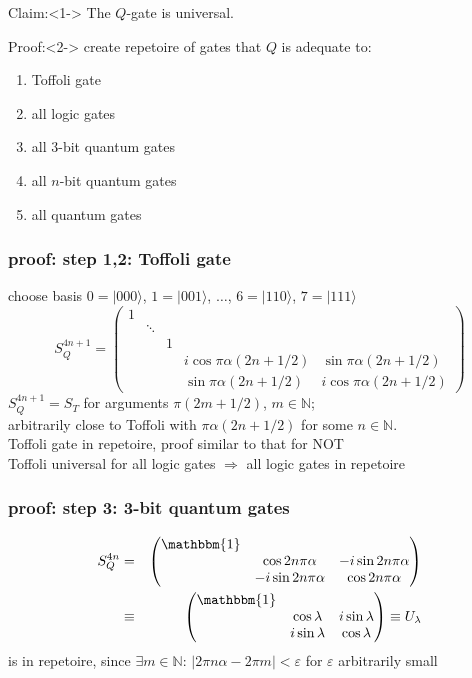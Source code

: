 \documentclass{beamer}
\begin{document}
\begin{frame}
    \begin{block}{Claim:}<1->
		The $Q$-gate is universal.
	\end{block}
    \begin{block}{Proof:}<2->
     	create repetoire of gates that $Q$ is adequate to:
	    	\begin{enumerate}
    	    	\item Toffoli gate
        		\item all logic gates
        		\item all $3$-bit quantum gates
        		\item all $n$-bit quantum gates
        		\item all quantum gates
    		\end{enumerate}
    \end{block}
\end{frame}
\begin{frame}
	\frametitle{proof: step 1,2: Toffoli gate}
    choose basis
    $0=|000\rangle$, $1=|001\rangle$, $\ldots$, $6=|110\rangle$, $7=|111\rangle$
    \begin{equation*}
        S_Q^{4n+1}=\begin{pmatrix}
            1&&&&\\
            &\ddots&&&\\
            &&1&&\\
            &&&i\cos\pi\alpha (2n+1/2)&\sin\pi\alpha (2n+1/2)\\
            &&&\sin\pi\alpha(2n+1/2)&i\cos\pi\alpha(2n+1/2)
        \end{pmatrix}
    \end{equation*}
    $S_Q^{4n+1}=S_T$ for arguments $\pi(2m+1/2)$, $m\in\mathbb{N}$;\\
    arbitrarily close to Toffoli with $\pi\alpha(2n+1/2)$ for some $n\in\mathbb{N}$.\\
    Toffoli gate in repetoire, proof similar to that for NOT\\
    Toffoli universal for all logic gates $\Rightarrow$ all logic gates in repetoire
\end{frame}
\begin{frame}
	\frametitle{proof: step 3: 3-bit quantum gates}
    \begin{eqnarray*}
        S_Q^{4n}&=&\begin{pmatrix}\mathbbm{1}&&\\
            &\cos 2n\pi\alpha&-i\sin2n\pi\alpha\\
            &-i\sin2n\pi\alpha&\cos2n\pi\alpha
        \end{pmatrix}\\
        &\equiv&\begin{pmatrix}\mathbbm{1}&&\\
            &\cos \lambda&i\sin\lambda\\
            &i\sin\lambda&\cos\lambda
        \end{pmatrix}\equiv U_\lambda
    \end{eqnarray*}
    is in repetoire, since $\exists m\in\mathbb{N}:\,|2\pi n\alpha-2\pi m|<\varepsilon$ for $\varepsilon$ arbitrarily small
\end{frame}
\end{document}
